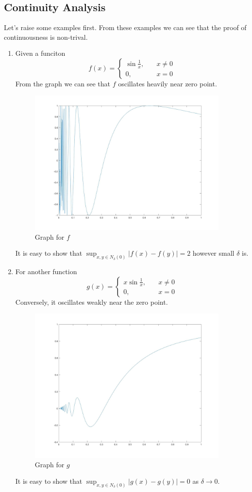 \subsection{Continuity Analysis}
Let's raise some examples first. From these examples we can see that the proof of continuousness is non-trival.
\begin{example}
\begin{enumerate}
\item
Given a funciton
\[
f(x) = \left\{
\begin{aligned}
\sin\frac{1}{x},&\quad x\ne0\\
0,&\quad x=0
\end{aligned}
\right.
\]
From the graph we can see that $f$ oscillates heavily near zero point.
\begin{figure}[H]
\centering
\includegraphics[width = 10cm]{3_F}
\caption{Graph for $f$}
\end{figure}

It is easy to show that $\sup_{x,y\in N_{\delta}(0)}|f(x) - f(y)|=2$ however small $\delta$ is.
\item
For another function
\[
g(x) = \left\{
\begin{aligned}
x\sin\frac{1}{x},&\quad x\ne0\\
0,&\quad x=0
\end{aligned}
\right.
\]
Conversely, it oscillates weakly near the zero point.
\begin{figure}[H]
\centering
\includegraphics[width = 10cm]{3_G}
\caption{Graph for $g$}
\end{figure}
It is easy to show that $\sup_{x,y\in N_{\delta}(0)}|g(x) - g(y)|=0$ as $\delta\to0$.
\end{enumerate}
\end{example}
